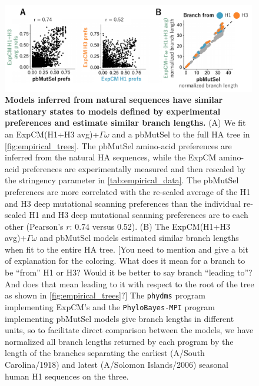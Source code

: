 \documentclass[11pt]{article}
\newcommand\jdbcomment[1]{{\color{red}[#1]}}
\begin{document}
\begin{figure}
\centerline{\includegraphics[width=0.99\textwidth]{figures/phylobayes.pdf}}
\caption{\label{fig:phylobayes}
\textbf{Models inferred from natural sequences have similar stationary states to models defined by experimental preferences and estimate similar branch lengths.}
(A) We fit an ExpCM(H1+H3 avg)+$\Gamma\omega$ and a pbMutSel to the full HA tree in \ref{fig:empirical_trees}. 
The pbMutSel amino-acid preferences are inferred from the natural HA sequences, while the ExpCM amino-acid preferences are experimentally measured and then rescaled by the stringency parameter in \ref{tab:empirical_data}. 
The pbMutSel preferences are more correlated with the re-scaled average of the H1 and H3 deep mutational scanning preferences than the individual re-scaled H1 and H3 deep mutational scanning preferences are to each other (Pearson's $r$: 0.74 versus 0.52). 
(B) The ExpCM(H1+H3 avg)+$\Gamma\omega$ and pbMutSel models estimated similar branch lengths when fit to the entire HA tree. 
\jdbcomment{You need to mention and give a bit of explanation for the coloring. What does it mean for a branch to be ``from'' H1 or H3? Would it be better to say branch ``leading to''? And does that mean leading to it with respect to the root of the tree as shown in \ref{fig:empirical_trees}?}
The \texttt{phydms} program implementing ExpCM's and the \texttt{PhyloBayes-MPI} program implementing pbMutSel models give branch lengths in different units, so to facilitate direct comparison between the models, we have normalized all branch lengths returned by each program by the length of the branches separating the earliest (A/South Carolina/1918) and latest (A/Solomon Islands/2006) seasonal human H1 sequences on the three. 
}
\end{figure}
\end{document}
